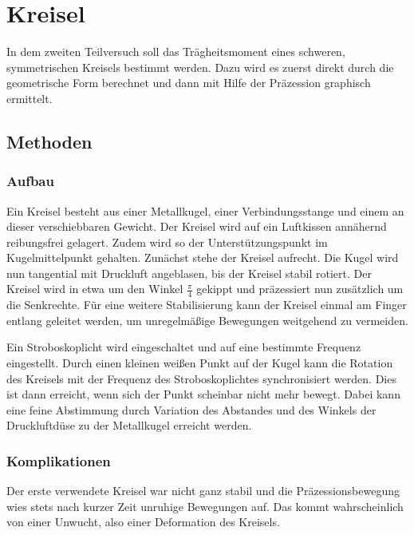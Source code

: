 \section{Kreisel} %

In dem zweiten Teilversuch  soll das Trägheitsmoment eines schweren, symmetrischen Kreisels bestimmt werden.
Dazu wird es zuerst direkt durch die geometrische Form berechnet und dann mit Hilfe der Präzession graphisch ermittelt.

\subsection{Methoden}

	\subsubsection{Aufbau}
	
	Ein Kreisel besteht aus einer Metallkugel, einer Verbindungsstange und einem an dieser verschiebbaren Gewicht.
	Der Kreisel wird auf ein Luftkissen annähernd reibungsfrei gelagert.
	Zudem wird so der Unterstützungspunkt im Kugelmittelpunkt gehalten.
	Zunächst stehe der Kreisel aufrecht.
	Die Kugel wird nun tangential mit Druckluft angeblasen, bis der Kreisel stabil rotiert.
	Der Kreisel wird in etwa um den Winkel $\frac{\pi}{4}$ gekippt und präzessiert nun zusätzlich um die Senkrechte.
	Für eine weitere Stabilisierung kann der Kreisel einmal am Finger entlang geleitet werden, um unregelmäßige Bewegungen weitgehend zu vermeiden.
	
	Ein Stroboskoplicht wird eingeschaltet und auf eine bestimmte Frequenz eingestellt.
	Durch einen kleinen weißen Punkt auf der Kugel kann die Rotation des Kreisels mit der Frequenz des Stroboskoplichtes synchronisiert werden.
	Dies ist dann erreicht, wenn sich der Punkt scheinbar nicht mehr bewegt.
	Dabei kann eine feine Abstimmung durch Variation des Abstandes und des Winkels der Druckluftdüse zu der Metallkugel erreicht werden.
	
	\subsubsection{Komplikationen}
	
	Der erste verwendete Kreisel war nicht ganz stabil und die Präzessionsbewegung wies stets nach kurzer Zeit unruhige Bewegungen auf.
	Das kommt wahrscheinlich von einer Unwucht, also einer Deformation des Kreisels.
	
